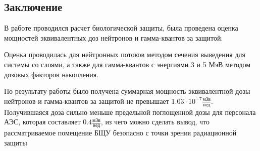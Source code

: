 \subsection{Заключение}
В работе проводился расчет биологической защиты, была проведена оценка мощностей эквивалентных доз нейтронов и гамма-квантов за защитой.

Оценка проводилась для нейтронных потоков методом сечения выведения для системы со слоями, а также для гамма-квантов с энергиями 3 и 5 МэВ методом дозовых факторов накопления.

По результату работы было получена суммарная мощность эквивалентной дозы нейтронов и гамма-квантов за защитой не превышает $1.03 \cdot 10^{- 7} \frac{\text{мЗв}}{\text{нед}}$. Получившаяся доза сильно меньше предельной поглощенной дозы для персонала АЭС, которая составляет $0.4 \frac{\text{мЗв}}{\text{нед}}$, из чего можно сделать вывод, что рассматриваемое помещение БЩУ безопасно с точки зрения радиационной защиты
\fi
